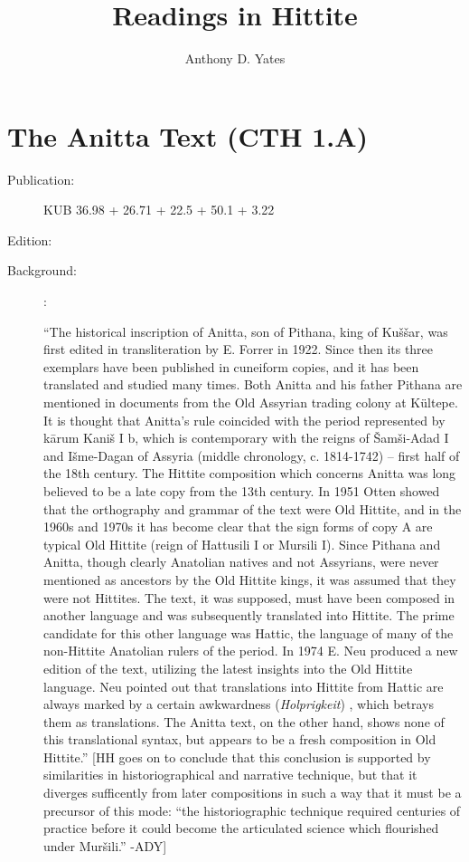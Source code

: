 \documentclass[10pt]{article}
\title{Readings in Hittite}
\author{Anthony D. Yates}
\renewcommand{\.}[1]{\textsubdot{#1}}
\begin{document}
\maketitle
\thispagestyle{empty}



\section{The Anitta Text (CTH 1.A)}

\begin{description}

\item[Publication:] KUB 36.98 + 26.71 + 22.5 + 50.1 + 3.22
\item[Edition:] \citet{neu1974anitta}
\item[Background:] \citet[291-93]{hoffner1980historians}: 

``The historical inscription of Anitta, son of Pithana, king of Ku\v{s}\v{s}ar, was first edited in transliteration by E. Forrer in 1922. Since then its three exemplars have been published in cuneiform copies, and it has been translated and studied many times. Both Anitta and his father Pithana are mentioned in documents from the Old Assyrian trading colony at K\"ultepe. It is thought that Anitta's rule coincided with the period represented by k\=arum Kani\v{s} I b, which is contemporary with the reigns of
\v{S}am\v{s}i-Adad I and I\v{s}me-Dagan of Assyria (middle chronology, c. 1814-1742) -- first half of the 18th century. The Hittite composition which concerns Anitta was long believed to be a late copy from the 13th century. In 1951 Otten showed that the orthography and grammar of the text were Old Hittite, and in the 1960s and 1970s it has become clear that the sign forms of copy A are typical Old Hittite (reign of Hattusili I or Mursili I). Since Pithana and Anitta, though clearly Anatolian natives and not Assyrians, were never mentioned as ancestors by the Old Hittite kings, it was assumed that they were not Hittites. The text, it was supposed, must have been composed in another language and was subsequently translated into Hittite. The prime candidate for this other language was Hattic, the language of many of the non-Hittite Anatolian rulers of the period. In 1974 E. Neu produced a new edition of the text, utilizing the latest insights into the Old Hittite language. Neu pointed out that translations into Hittite from Hattic are always marked by a certain awkwardness (\textit{Holprigkeit}) , which betrays them as translations. The Anitta text, on the other hand, shows none of this translational syntax, but appears to be a fresh composition in Old Hittite.''
[HH goes on to conclude that this conclusion is supported by similarities in historiographical and narrative technique, but that it diverges sufficently from later compositions in such a way that it must be a precursor of this mode: ``the historiographic technique required centuries of practice before it could become the articulated science which flourished under Mur\v{s}ili.'' -ADY]


\end{description}
\end{document}
